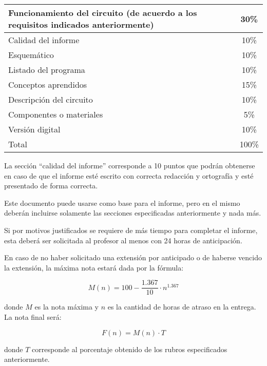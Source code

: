 \documentclass[12pt,letterpaper]{IEEEtran}
\begin{document}
\begin{center}
 \begin{tabular}{p{}|c}\hline
   Funcionamiento del circuito (de acuerdo a los requisitos indicados anteriormente) 					     & 30\% \\\hline
   Calidad del informe	  				& 10\% \\\hline
   Esquemático							& 10\% \\\hline
   Listado del programa					& 10\% \\\hline
   Conceptos aprendidos					& 15\% \\\hline
   Descripción del circuito				& 10\% \\\hline
   Componentes o materiales				& 5\% \\\hline
   Versión digital						& 10\% \\\hline\hline
   Total								& 100\% \\
 \end{tabular}
\end{center}

La sección ``calidad del informe'' corresponde a 10 puntos que podrán obtenerse en caso de que el informe esté escrito con correcta redacción y ortografía y esté presentado de forma correcta.

Este documento puede usarse como base para el informe, pero en el mismo deberán incluirse solamente las secciones especificadas anteriormente y nada más.

Si por motivos justificados se requiere de más tiempo para completar el informe, esta deberá ser solicitada al profesor al menos con 24 horas de anticipación.

En caso de no haber solicitado una extensión por anticipado o de haberse vencido la extensión, la máxima nota estará dada por la fórmula:

\[ M(n) = 100-\frac{1.367}{10}\cdot n^{1.367} \]

donde $M$ es la nota máxima y $n$ es la cantidad de horas de atraso en la entrega. La nota final será:

\[ F(n) = M(n)\cdot T \]

donde $T$ corresponde al porcentaje obtenido de los rubros especificados anteriormente.
\end{document}
